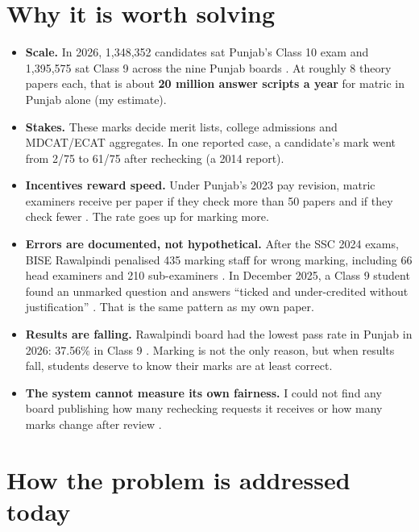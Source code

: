 \section{Why it is worth solving}
\begin{itemize}
  \item \textbf{Scale.} In 2026, 1,348,352 candidates sat Punjab's Class 10 exam and 1,395,575 sat Class 9 across the nine
        Punjab boards \citep{propk2026matric,propk2026class9}. At roughly 8 theory papers each, that is about
        \textbf{20 million answer scripts a year} for matric in Punjab alone (my estimate).
  \item \textbf{Stakes.} These marks decide merit lists, college admissions and MDCAT/ECAT aggregates. In one reported
        case, a candidate's mark went from 2/75 to 61/75 after rechecking \citep{tribune2014fiasco} (a 2014 report).
  \item \textbf{Incentives reward speed.} Under Punjab's 2023 pay revision, matric examiners receive  per paper if they
        check more than 50 papers and  if they check fewer \citep{propk2023fee}. The rate goes up for marking more.
  \item \textbf{Errors are documented, not hypothetical.} After the SSC 2024 exams, BISE Rawalpindi penalised 435 marking
        staff for wrong marking, including 66 head examiners and 210 sub-examiners \citep{dawn2024examiners}. In December
        2025, a Class 9 student found an unmarked question and answers ``ticked and under-credited without justification''
        \citep{tribune2025receiving}. That is the same pattern as my own paper.
  \item \textbf{Results are falling.} Rawalpindi board had the lowest pass rate in Punjab in 2026: 37.56\% in Class 9
        \citep{propk2026class9}. Marking is not the only reason, but when results fall, students deserve to know their
        marks are at least correct.
  \item \textbf{The system cannot measure its own fairness.} I could not find any board publishing how many rechecking
        requests it receives or how many marks change after review \citep{research01}.
\end{itemize}

\section{How the problem is addressed today}

